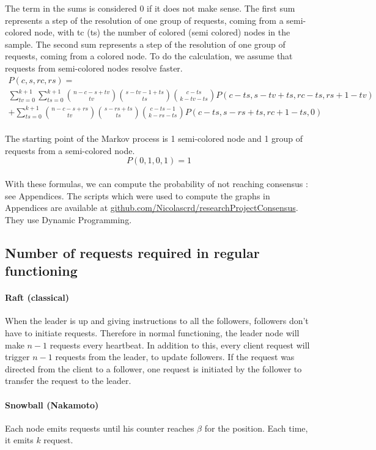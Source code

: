 \documentclass[11pt, twocolumn]{article}
\begin{document}
The term in the sums is considered 0 if it does not make sense.
The first sum represents a step of the resolution of one group of requests, coming from a semi-colored node, with tc (ts) the number of colored (semi colored) nodes in the sample.
The second sum represents a step of the resolution of one group of requests, coming from a colored node.
To do the calculation, we assume that requests from semi-colored nodes resolve faster.
\begin{multline*}
    P(c, s, rc, rs) = \\ \sum_{tv=0}^{k+1}\sum_{ts=0}^{k+1} {n-c-s+tv \choose tv}{s-tv-1+ts \choose ts}{c-ts \choose k-tv-ts}P(c-ts, s-tv+ts, rc-ts, rs+1-tv)
    \\ + \sum_{ts=0}^{k+1} {n-c-s+rs \choose tv}{s-rs+ts \choose ts}{c-ts-1 \choose k-rs-ts}P(c-ts, s-rs+ts, rc+1-ts, 0)
\end{multline*}
\\
The starting point of the Markov process is 1 semi-colored node and 1 group of requests from a semi-colored node. 
\begin{equation*}
    P(0, 1, 0, 1) = 1
\end{equation*}
\\
With these formulas, we can compute the probability of not reaching consensus : see Appendices.
The scripts which were used to compute the graphs in Appendices are available at \href{https://github.com/Nicolascrd/researchProjectConsensus}{github.com/Nicolascrd/researchProjectConsensus}. They use Dynamic Programming.

\subsection{Number of requests required in regular functioning}

\paragraph{Raft (classical)}
When the leader is up and giving instructions to all the followers, followers don't have to initiate requests.
Therefore in normal functioning, the leader node will make $n-1$ requests every heartbeat.
In addition to this, every client request will trigger $n-1$ requests from the leader, to update followers. If the request was directed from the client to a follower, one request is initiated
by the follower to transfer the request to the leader.

\paragraph{Snowball (Nakamoto)}
Each node emits requests until his counter reaches $\beta$ for the position. Each time, it emits $k$ request. 
\end{document}
